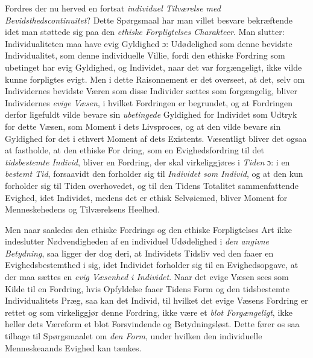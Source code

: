 Fordres der nu herved en fortsat \emph{individuel Tilværelse med
Bevidsthedscontinuitet}? Dette Spørgsmaal har man villet besvare bekræftende idet
man støttede sig paa den \emph{ethiske Forpligtelses Charakteer}. Man slutter:
Individualiteten maa have evig Gyldighed ɔ: Udødelighed som denne bevidste
Individualitet, som denne individuelle Villie, fordi den ethiske Fordring som
ubetinget har evig Gyldighed, og Individet, naar det var forgængeligt, ikke vilde
kunne forpligtes evigt. Men i dette Raisonnement er det overseet, at det, selv om
Individernes bevidste Væren som disse Individer sættes som forgængelig, bliver
Individernes \emph{evige Væsen}, i hvilket Fordringen er begrundet, og at
Fordringen derfor ligefuldt vilde bevare sin \emph{ubetingede} Gyldighed for
Individet som Udtryk for dette Væsen, som Moment i dets Livsproces, og at den
vilde bevare sin Gyldighed for det i ethvert Moment af dets Existents. Væsentligt
bliver det ogsaa at fastholde, at den ethiske For\-%
dring, som en Evighedsfordring til det \emph{tidsbestemte Individ}, bliver en
Fordring, der skal virkeliggjøres i \emph{Tiden} ɔ: i en \emph{bestemt Tid},
forsaavidt den forholder sig til \emph{Individet som Individ}, og at den kun
forholder sig til Tiden overhovedet, og til den Tidens Totalitet sammenfattende
Evighed, idet Individet, medens det er ethisk Selvøiemed, bliver Moment for
Menneskehedens og Tilværelsens Heelhed.

Men naar saaledes den ethiske Fordrings og den ethiske Forpligtelses Art ikke
indeslutter Nødvendigheden af en individuel Udødelighed i \emph{den angivne
Betydning}, saa ligger der dog deri, at Individets Tidsliv ved den faaer en
Evighedsbestemthed i sig, idet Individet forholder sig til en Evighedsopgave, at
der maa sættes en \emph{evig Væsenhed i Individet}. Naar det evige Væsen sees som
Kilde til en Fordring, hvis Opfyldelse faaer Tidens Form og den tidsbestemte
Individualitets Præg, saa kan det Individ, til hvilket det evige Væsens Fordring
er rettet og som virkeliggjør denne Fordring, ikke være et \emph{blot
Forgængeligt}, ikke heller dets Væreform et blot Forsvindende og Betydningsløst.
Dette fører os saa tilbage til Spørgsmaalet om \emph{den Form}, under hvilken den
individuelle Menneskeaands Evighed kan tænkes.

